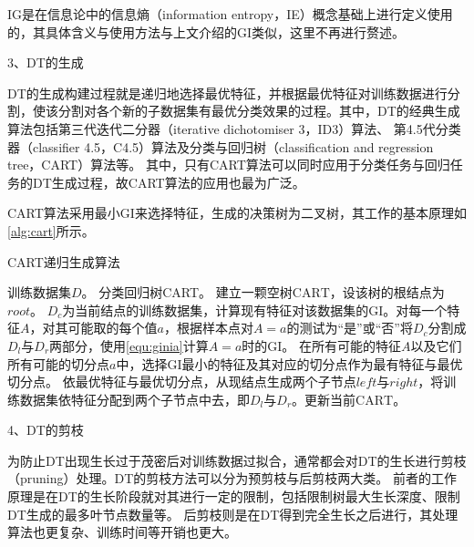 IG是在信息论中的信息熵（information entropy，IE）概念基础上进行定义使用的，其具体含义与使用方法与上文介绍的GI类似，这里不再进行赘述\cite{Zhou2016,Li2017}。

3、DT的生成

DT的生成构建过程就是递归地选择最优特征，并根据最优特征对训练数据进行分割，使该分割对各个新的子数据集有最优分类效果的过程。其中，DT的经典生成算法包括第三代迭代二分器（iterative dichotomiser 3，ID3）算法、
第4.5代分类器（classifier 4.5，C4.5）算法及分类与回归树（classification and regression tree，CART）算法等\cite{quinlan1986,quinlan1993,breiman1984}。
其中，只有CART算法可以同时应用于分类任务与回归任务的DT生成过程，故CART算法的应用也最为广泛。

CART算法采用最小GI来选择特征，生成的决策树为二叉树，其工作的基本原理如\autoref{alg:cart}所示。
\begin{breakablealgorithm}
      \caption[CART生成算法]{CART递归生成算法\cite{Li2017}}
      \label{alg:cart}
      \begin{algorithmic}[1] %
            \Require 训练数据集$D$。
            \Ensure 分类回归树CART。
            \State 建立一颗空树$\text{CART}$，设该树的根结点为$root$。
                  \State $D_c$为当前结点的训练数据集，计算现有特征对该数据集的GI。对每一个特征$A$，对其可能取的每个值$a$，根据样本点对$A=a$的测试为“是”或“否”将$D_c$分割成$D_l$与$D_r$两部分，使用\autoref{equ:ginia}计算$A=a$时的GI。
                  \State 在所有可能的特征$A$以及它们所有可能的切分点$a$中，选择GI最小的特征及其对应的切分点作为最有特征与最优切分点。
                  \State 依最优特征与最优切分点，从现结点生成两个子节点$left$与$right$，将训练数据集依特征分配到两个子节点中去，即$D_l$与$D_r$。更新当前$\text{CART}$。
                  \State {}
                  \Else    
                  \State {}
                  \State {}
                  \EndIf
            \EndFunction
      \end{algorithmic}
\end{breakablealgorithm}

4、DT的剪枝

为防止DT出现生长过于茂密后对训练数据过拟合，通常都会对DT的生长进行剪枝（pruning）处理。DT的剪枝方法可以分为预剪枝与后剪枝两大类。
前者的工作原理是在DT的生长阶段就对其进行一定的限制，包括限制树最大生长深度、限制DT生成的最多叶节点数量等。
后剪枝则是在DT得到完全生长之后进行，其处理算法也更复杂、训练时间等开销也更大\cite{Zhou2016,Liu2018}。

